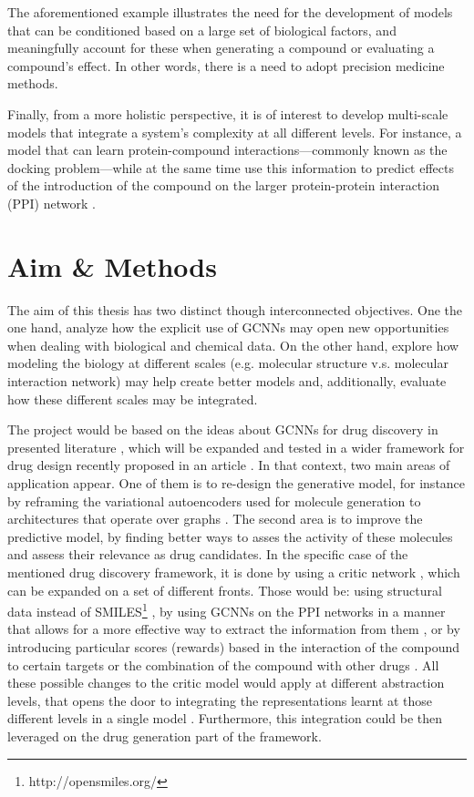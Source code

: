 \documentclass{article}
\begin{document}
The aforementioned example illustrates the need for the development of models that can
 be conditioned based on a large set of biological factors, and meaningfully account for
 these when generating a compound or evaluating a compound's effect. In other words,
 there is a need to adopt precision medicine methods.

Finally, from a more holistic perspective, it is of interest to develop multi-scale
 models that integrate a system's complexity at all different levels. For instance, a
 model that can learn protein-compound interactions---commonly known as the docking
 problem---while at the same time use this information to predict effects of the
 introduction of the compound on the larger protein-protein interaction (PPI) network
 \cite{Sun2019}.


    \section*{Aim \& Methods}


The aim of this thesis has two distinct though interconnected objectives. One the one
 hand, analyze how the explicit use of GCNNs may open new opportunities when dealing
 with biological and chemical data. On the other hand, explore how modeling the biology
 at different scales (e.g. molecular structure v.s. molecular interaction network) may
 help create better models and, additionally, evaluate how these different scales may be
 integrated.

The project would be based on the ideas about GCNNs for drug discovery in presented
 literature \cite{Sun2019}, which will be expanded and tested in a wider framework for
 drug design recently proposed in an article \cite{Born2019}. In that context, two main
 areas of application appear. One of them is to re-design the generative model, for
 instance by reframing the variational autoencoders used for molecule generation to
 architectures that operate over graphs \cite{Simonovsky2018,Li2018, Li2018a}. The
 second area is to improve the predictive model, by finding better ways to asses the
 activity of these molecules and assess their relevance as drug candidates. In the
 specific case of the mentioned drug discovery framework, it is done by using a critic
 network \cite{Manica2019}, which can be expanded on a set of different fronts. Those
 would be: using structural data instead of SMILES\footnote{http://opensmiles.org/}
 \cite{Li, Do2019}, {\color{red} by using GCNNs on the PPI networks in a manner that
 allows for a more effective way to extract the information from them}
 \cite{Oskooei2019, Wang2019}, or by introducing particular scores (rewards) based in
 the interaction of the compound to certain targets \cite{YingkaiGao2018,
 Zhavoronkov2019} or the combination of the compound with other drugs \cite{Zitnik2018}.
 All these possible changes to the critic model would apply at different abstraction
 levels, that opens the door to integrating the representations learnt at those
 different levels in a single model \cite{Ying2018, Ma2019, Huang2019}. Furthermore,
 this integration could be then leveraged on the drug generation part of the framework.
\end{document}
